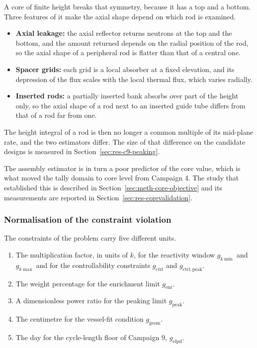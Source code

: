 A core of finite height breaks that symmetry, because it has a top and
a bottom. Three features of it make the axial shape depend on which rod
is examined.

\begin{itemize}
  \item \textbf{Axial leakage:} the axial reflector returns neutrons at
        the top and the bottom, and the amount returned depends on the
        radial position of the rod, so the axial shape of a peripheral
        rod is flatter than that of a central one.

  \item \textbf{Spacer grids:} each grid is a local absorber at a fixed
        elevation, and its depression of the flux scales with the local
        thermal flux, which varies radially.

  \item \textbf{Inserted rods:} a partially inserted bank absorbs over
        part of the height only, so the axial shape of a rod next to an
        inserted guide tube differs from that of a rod far from one.
\end{itemize}

The height integral of a rod is then no longer a common multiple of its
mid-plane rate, and the two estimators differ. The size of that
difference on the candidate designs is measured in
Section~\ref{sec:res-c9-peaking}.

The assembly estimator is in turn a poor predictor of the core value,
which is what moved the tally domain to core level from Campaign 4. The
study that established this is described in
Section~\ref{sec:meth-core-objective} and its measurements are reported
in Section~\ref{sec:res-corevalidation}.

\subsubsection{Normalisation of the constraint violation}
\label{subsubsec:cv-norm}

The constraints of the problem carry five different units.

\begin{enumerate}
  \item The multiplication factor, in units of $k$, for the reactivity
        window $g_{k\min}$ and $g_{k\max}$ and for the controllability
constraints $g_\mathrm{ctrl}$ and $g_\mathrm{ctrl,peak}$.

  \item The weight percentage for the enrichment limit
        $g_\mathrm{enr}$.

  \item A dimensionless power ratio for the peaking limit
        $g_\mathrm{peak}$.

  \item The centimetre for the vessel-fit condition
        $g_\mathrm{geom}$.

  \item The day for the cycle-length floor of Campaign 9,
        $g_\mathrm{efpd}$.
\end{enumerate}

